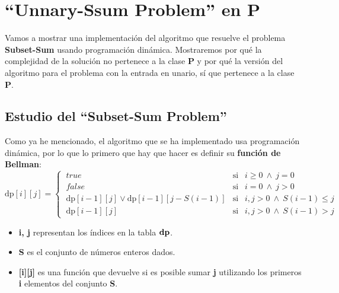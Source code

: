 \documentclass[../main]{subfiles}
\begin{document}
\chapter{``Unnary-Ssum Problem” en P}

{
\hypersetup{linkcolor=black}
\minitoc
\vspace{5mm}
}

Vamos a mostrar una implementación del algoritmo que resuelve el problema \textbf{Subset-Sum} usando programación dinámica. Mostraremos por qué la complejidad de la solución no pertenece a la clase \textbf{P} y por qué la versión del algoritmo para el problema con la entrada en unario, sí que pertenece a la clase\textbf{ P}. 
\section{Estudio del ``Subset-Sum Problem''}
Como ya he mencionado, el algoritmo que se ha implementado usa programación dinámica, por lo que lo primero que hay que hacer es definir su \textbf{función de Bellman}:
\begin{equation*}
    \text{dp}[i][j] = \begin{cases}
  \ true \ \ & \text{si } \  \ i\geq 0  \ \land \ j = 0 \\
  \ false & \text{si } \ \ i = 0 \ \land \ j > 0\\
  \ \text{dp}[i-1][j]  \lor  \text{dp}[i-1][j-S(i-1)] & \text{si } \ \ i,j>0 \ \land \ S(i-1) \leq j  \\
  \ \text{dp}[i-1][j] & \text{si } \ \ i,j>0 \ \land \ S(i-1) > j
\end{cases}
\end{equation*}
\begin{itemize}
    \item[\textbullet] \textbf{i, j} representan los índices en la tabla $\text{\textbf{dp}}$.
    \item[\textbullet] \textbf{S} es el conjunto de números enteros dados.
    \item[\textbullet] \textbf{[i][j]} es una función que devuelve si es posible sumar \textbf{j} utilizando los primeros \textbf{i} elementos del conjunto \textbf{S}.
\end{itemize}
\end{document}
